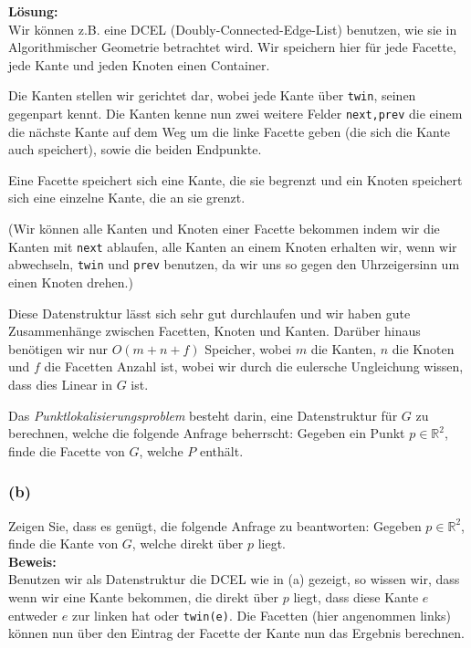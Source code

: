\documentclass[11pt,a4paper,ngerman]{article}
\begin{document}
\noindent\textbf{Lösung:}\\
Wir können z.B. eine DCEL (Doubly-Connected-Edge-List) benutzen, wie sie in Algorithmischer Geometrie betrachtet wird. Wir speichern hier
für jede Facette, jede Kante und jeden Knoten einen Container.

Die Kanten stellen wir gerichtet dar, wobei jede Kante über \lstinline|twin|, seinen gegenpart kennt. Die Kanten kenne nun zwei weitere Felder
\lstinline|next,prev| die einem die nächste Kante auf dem Weg um die linke Facette geben (die sich die Kante auch speichert), sowie die beiden Endpunkte.

Eine Facette speichert sich eine Kante, die sie begrenzt und ein Knoten speichert sich eine einzelne Kante, die an sie grenzt.

(Wir können alle Kanten und Knoten einer Facette bekommen indem wir die Kanten mit \lstinline|next| ablaufen, alle Kanten an einem Knoten erhalten
wir, wenn wir abwechseln, \lstinline|twin| und \lstinline|prev| benutzen, da wir uns so gegen den Uhrzeigersinn um einen Knoten drehen.)

Diese Datenstruktur lässt sich sehr gut durchlaufen und wir haben gute Zusammenhänge zwischen Facetten, Knoten und Kanten. Darüber hinaus benötigen wir nur $O(m+n+f)$ Speicher, wobei $m$ die Kanten, $n$ die Knoten und $f$ die Facetten Anzahl ist, wobei wir durch die eulersche Ungleichung wissen, dass dies Linear in $G$ ist.

\vspace{4\baselineskip}

Das \emph{Punktlokalisierungsproblem} besteht darin, eine Datenstruktur für $G$ zu berechnen, welche die folgende Anfrage beherrscht: Gegeben ein Punkt $p \in \mathbb{R}^2$, finde die Facette von $G$, welche $P$ enthält.

\subsubsection*{(b)}
Zeigen Sie, dass es genügt, die folgende Anfrage zu beantworten: Gegeben $p\in \mathbb{R}^2$, finde die Kante von $G$, welche direkt über $p$ liegt.\\

\noindent\textbf{Beweis:}\\

Benutzen wir als Datenstruktur die DCEL wie in (a) gezeigt, so wissen wir, dass wenn wir eine Kante bekommen, die direkt über $p$ liegt, dass
diese Kante $e$ entweder $e$ zur linken hat oder \lstinline|twin(e)|. Die Facetten (hier angenommen links) können nun über den Eintrag der Facette der Kante nun das Ergebnis berechnen.\\
\end{document}
